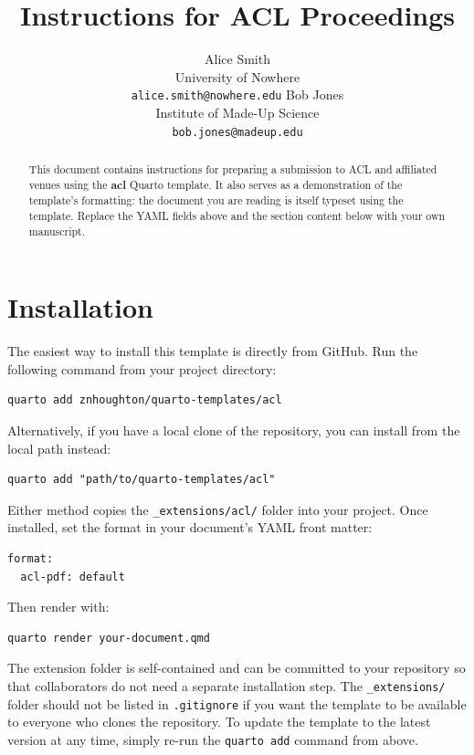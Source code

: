 \documentclass[11pt]{article}
\date{}
\title{Instructions for ACL Proceedings}
\author{
  Alice Smith \\
      University of Nowhere \\
        \texttt{alice.smith@nowhere.edu}
     \And
  Bob Jones \\
      Institute of Made-Up Science \\
        \texttt{bob.jones@madeup.edu}
    }
\begin{document}
\maketitle

\begin{abstract}
This document contains instructions for preparing a submission to ACL
and affiliated venues using the \textbf{acl} Quarto template. It also
serves as a demonstration of the template's formatting: the document you
are reading is itself typeset using the template. Replace the YAML
fields above and the section content below with your own manuscript.
\end{abstract}

\section{Installation}\label{installation}

The easiest way to install this template is directly from GitHub. Run
the following command from your project directory:

\begin{verbatim}
quarto add znhoughton/quarto-templates/acl
\end{verbatim}

Alternatively, if you have a local clone of the repository, you can
install from the local path instead:

\begin{verbatim}
quarto add "path/to/quarto-templates/acl"
\end{verbatim}

Either method copies the \texttt{\_extensions/acl/} folder into your
project. Once installed, set the format in your document's YAML front
matter:

\begin{verbatim}
format:
  acl-pdf: default
\end{verbatim}

Then render with:

\begin{verbatim}
quarto render your-document.qmd
\end{verbatim}

The extension folder is self-contained and can be committed to your
repository so that collaborators do not need a separate installation
step. The \texttt{\_extensions/} folder should not be listed in
\texttt{.gitignore} if you want the template to be available to everyone
who clones the repository. To update the template to the latest version
at any time, simply re-run the \texttt{quarto\ add} command from above.
\end{document}
